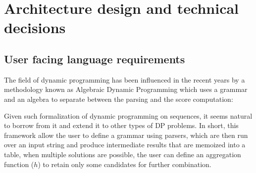 \newpage
\section{Architecture design and technical decisions}
\subsection{User facing language requirements}
The field of dynamic programming has been influenced in the recent years by a methodology known as Algebraic Dynamic Programming which uses a grammar and an algebra to separate between the parsing and the score computation:

Given such formalization \cite{adp} of dynamic programming on sequences, it seems natural to borrow from it and extend it to other types of DP problems. In short, this framework allow the user to define a grammar using parsers, which are then run over an input string and produce intermediate results that are memoized into a table, when multiple solutions are possible, the user can define an aggregation function ($h$) to retain only some candidates for further combination.

